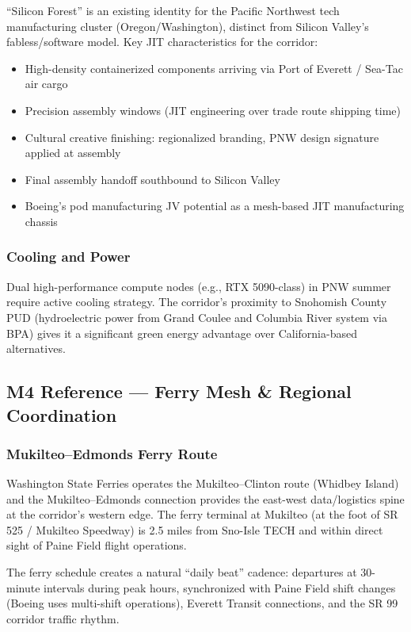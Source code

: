 \documentclass[11pt,letterpaper]{article}
\begin{document}
``Silicon Forest'' is an existing identity for the Pacific Northwest tech manufacturing cluster (Oregon/Washington), distinct from Silicon Valley's fabless/software model. Key JIT characteristics for the corridor:

\begin{itemize}[leftmargin=*]
  \item High-density containerized components arriving via Port of Everett / Sea-Tac air cargo
  \item Precision assembly windows (JIT engineering over trade route shipping time)
  \item Cultural creative finishing: regionalized branding, PNW design signature applied at assembly
  \item Final assembly handoff southbound to Silicon Valley
  \item Boeing's pod manufacturing JV potential as a mesh-based JIT manufacturing chassis
\end{itemize}

\subsubsection{Cooling and Power}

Dual high-performance compute nodes (e.g., RTX 5090-class) in PNW summer require active cooling strategy. The corridor's proximity to Snohomish County PUD (hydroelectric power from Grand Coulee and Columbia River system via BPA) gives it a significant green energy advantage over California-based alternatives.

\subsection{M4 Reference --- Ferry Mesh \& Regional Coordination}

\subsubsection{Mukilteo--Edmonds Ferry Route}

Washington State Ferries operates the Mukilteo--Clinton route (Whidbey Island) and the Mukilteo--Edmonds connection provides the east-west data/logistics spine at the corridor's western edge. The ferry terminal at Mukilteo (at the foot of SR 525 / Mukilteo Speedway) is 2.5 miles from Sno-Isle TECH and within direct sight of Paine Field flight operations.

The ferry schedule creates a natural ``daily beat'' cadence: departures at 30-minute intervals during peak hours, synchronized with Paine Field shift changes (Boeing uses multi-shift operations), Everett Transit connections, and the SR 99 corridor traffic rhythm.
\end{document}
